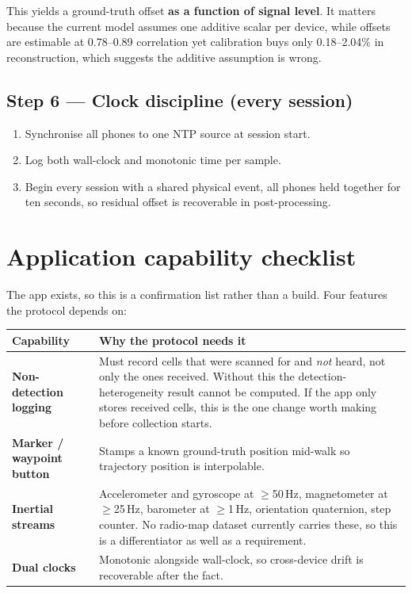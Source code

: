 \documentclass[11pt,a4paper]{article}
\begin{document}
This yields a ground-truth offset \textbf{as a function of signal level}. It matters
because the current model assumes one additive scalar per device, while offsets are
estimable at 0.78--0.89 correlation yet calibration buys only 0.18--2.04\% in
reconstruction, which suggests the additive assumption is wrong.

\subsection{Step 6 --- Clock discipline (every session)}

\begin{enumerate}
\item Synchronise all phones to one NTP source at session start.
\item Log both wall-clock and monotonic time per sample.
\item Begin every session with a shared physical event, all phones held together for ten
seconds, so residual offset is recoverable in post-processing.
\end{enumerate}

\section{Application capability checklist}

The app exists, so this is a confirmation list rather than a build. Four features the
protocol depends on:

\begin{center}\small
\begin{tabular}{@{}p{4.6cm}p{11.4cm}@{}}
\toprule
Capability & Why the protocol needs it \\ \midrule
\textbf{Non-detection logging} & Must record cells that were scanned for and \emph{not}
heard, not only the ones received. Without this the detection-heterogeneity result cannot
be computed. If the app only stores received cells, this is the one change worth making
before collection starts. \\
\textbf{Marker / waypoint button} & Stamps a known ground-truth position mid-walk so
trajectory position is interpolable. \\
\textbf{Inertial streams} & Accelerometer and gyroscope at $\ge$50\,Hz, magnetometer at
$\ge$25\,Hz, barometer at $\ge$1\,Hz, orientation quaternion, step counter. No radio-map
dataset currently carries these, so this is a differentiator as well as a requirement. \\
\textbf{Dual clocks} & Monotonic alongside wall-clock, so cross-device drift is
recoverable after the fact. \\
\bottomrule
\end{tabular}
\end{center}
\end{document}
